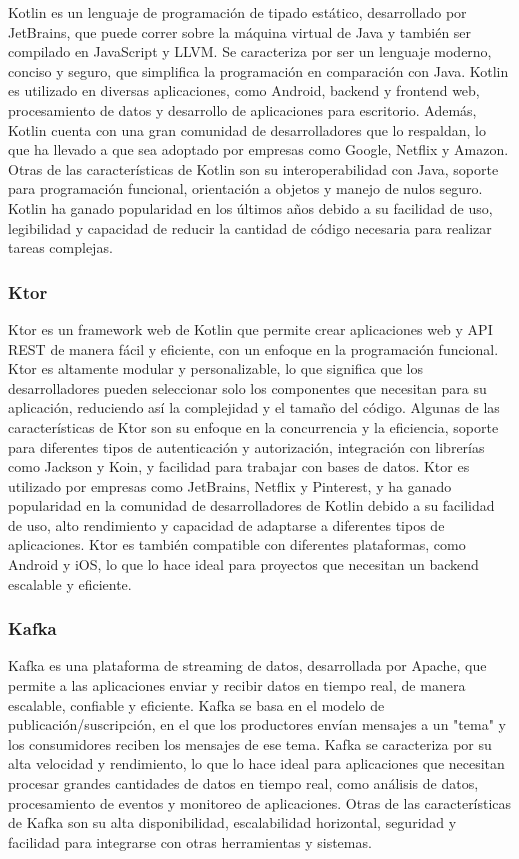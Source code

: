 Kotlin es un lenguaje de programación de tipado estático, desarrollado por JetBrains, que puede correr sobre la máquina virtual de Java y también ser compilado en JavaScript y LLVM. Se caracteriza por ser un lenguaje moderno, conciso y seguro, que simplifica la programación en comparación con Java. Kotlin es utilizado en diversas aplicaciones, como Android, backend y frontend web, procesamiento de datos y desarrollo de aplicaciones para escritorio. Además, Kotlin cuenta con una gran comunidad de desarrolladores que lo respaldan, lo que ha llevado a que sea adoptado por empresas como Google, Netflix y Amazon. Otras de las características de Kotlin son su interoperabilidad con Java, soporte para programación funcional, orientación a objetos y manejo de nulos seguro. Kotlin ha ganado popularidad en los últimos años debido a su facilidad de uso, legibilidad y capacidad de reducir la cantidad de código necesaria para realizar tareas complejas.


\subsubsection{Ktor}

Ktor es un framework web de Kotlin que permite crear aplicaciones web y API REST de manera fácil y eficiente, con un enfoque en la programación funcional. Ktor es altamente modular y personalizable, lo que significa que los desarrolladores pueden seleccionar solo los componentes que necesitan para su aplicación, reduciendo así la complejidad y el tamaño del código. Algunas de las características de Ktor son su enfoque en la concurrencia y la eficiencia, soporte para diferentes tipos de autenticación y autorización, integración con librerías como Jackson y Koin, y facilidad para trabajar con bases de datos. Ktor es utilizado por empresas como JetBrains, Netflix y Pinterest, y ha ganado popularidad en la comunidad de desarrolladores de Kotlin debido a su facilidad de uso, alto rendimiento y capacidad de adaptarse a diferentes tipos de aplicaciones. Ktor es también compatible con diferentes plataformas, como Android y iOS, lo que lo hace ideal para proyectos que necesitan un backend escalable y eficiente.


\subsubsection{Kafka}

Kafka es una plataforma de streaming de datos, desarrollada por Apache, que permite a las aplicaciones enviar y recibir datos en tiempo real, de manera escalable, confiable y eficiente. Kafka se basa en el modelo de publicación/suscripción, en el que los productores envían mensajes a un "tema" y los consumidores reciben los mensajes de ese tema. Kafka se caracteriza por su alta velocidad y rendimiento, lo que lo hace ideal para aplicaciones que necesitan procesar grandes cantidades de datos en tiempo real, como análisis de datos, procesamiento de eventos y monitoreo de aplicaciones. Otras de las características de Kafka son su alta disponibilidad, escalabilidad horizontal, seguridad y facilidad para integrarse con otras herramientas y sistemas. 

